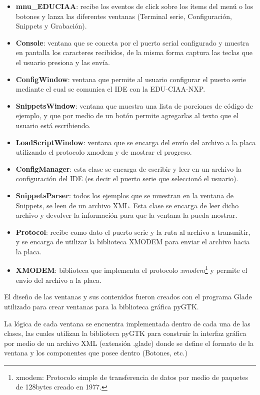\begin{itemize}
	\item \textbf{mnu\_EDUCIAA}: recibe los eventos de click sobre los ítems del menú o los botones y lanza las diferentes ventanas (Terminal serie, Configuración, Snippets y Grabación).
	\item \textbf{Console}: ventana que se conecta por el puerto serial configurado y muestra en pantalla los caracteres recibidos, de la misma forma captura las teclas que el usuario presiona y las envía.
	\item \textbf{ConfigWindow}: ventana que permite al usuario configurar el puerto serie mediante el cual se comunica el IDE con la EDU-CIAA-NXP.
	\item \textbf{SnippetsWindow}: ventana que muestra una lista de porciones de código de ejemplo, y que por medio de un botón permite agregarlas al texto que el usuario está escribiendo.
	\item \textbf{LoadScriptWindow}: ventana que se encarga del envío del archivo a la placa utilizando el protocolo xmodem y de mostrar el progreso.
	\item \textbf{ConfigManager}: esta clase se encarga de escribir y leer en un archivo la configuración del IDE (es decir el puerto serie que seleccionó el usuario).
	\item \textbf{SnippetsParser}: todos los ejemplos que se muestran en la ventana de Snippets, se leen de un archivo XML. Esta clase se encarga de leer dicho archivo y devolver la información para que la ventana la pueda mostrar.	
	\item \textbf{Protocol}: recibe como dato el puerto serie y la ruta al archivo a transmitir, y se encarga de utilizar la biblioteca XMODEM para enviar el archivo hacia la placa.
	\item \textbf{XMODEM}: biblioteca que implementa el protocolo \textit{xmodem}\footnote{xmodem: Protocolo simple de transferencia de datos por medio de paquetes de 128bytes creado en 1977.} y permite el envío del archivo a la placa.	
\end{itemize}

El diseño de las ventanas y sus contenidos fueron creados con el programa Glade \cite{glade} utilizado para crear ventanas para la biblioteca gráfica pyGTK.

La lógica de cada ventana se encuentra implementada dentro de cada una de las clases, las cuales utilizan la biblioteca pyGTK para construir la interfaz gráfica por medio de un archivo XML (extensión .glade) donde se define el formato de la ventana y los componentes que posee dentro (Botones, etc.)

